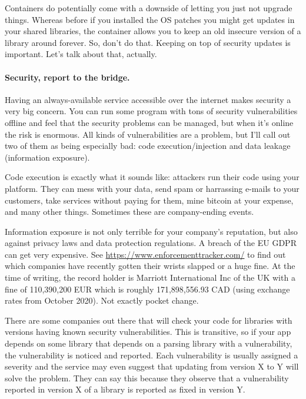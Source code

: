 \documentclass[a4paper]{report}
\begin{document}
Containers do potentially come with a downside of letting you just not upgrade things. Whereas before if you installed the OS patches you might get updates in your shared libraries, the container allows you to keep an old insecure version of a library around forever. So, don't do that. Keeping on top of security updates is important. Let's talk about that, actually.

\paragraph{Security, report to the bridge.}
Having an always-available service accessible over the internet makes security a very big concern. You can run some program with tons of security vulnerabilities offline and feel that the security problems can be managed, but when it's online the risk is enormous. All kinds of vulnerabilities are a problem, but I'll call out two of them as being especially bad: code execution/injection and data leakage (information exposure). 

Code execution is exactly what it sounds like: attackers run their code using your platform. They can mess with your data, send spam or harrassing e-mails to your customers, take services without paying for them, mine bitcoin at your expense, and many other things. Sometimes these are company-ending events.

Information exposure is not only terrible for your company's reputation, but also against privacy laws and data protection regulations. A breach of the EU GDPR can get very expensive. See \url{https://www.enforcementtracker.com/} to find out which companies have recently gotten their wrists slapped or a huge fine. At the time of writing, the record holder is Marriott International Inc of the UK with a fine of 	110,390,200 EUR which is roughly 171,898,556.93 CAD (using exchange rates from October 2020). Not exactly pocket change.

There are some companies out there that will check your code for libraries with versions having known security vulnerabilities. This is transitive, so if your app depends on some library that depends on a parsing library with a vulnerability, the vulnerability is noticed and reported. Each vulnerability is usually assigned a severity and the service may even suggest that updating from version X to Y will solve the problem. They can say this because they observe that a vulnerability reported in version X of a library is reported as fixed in version Y. 
\end{document}
